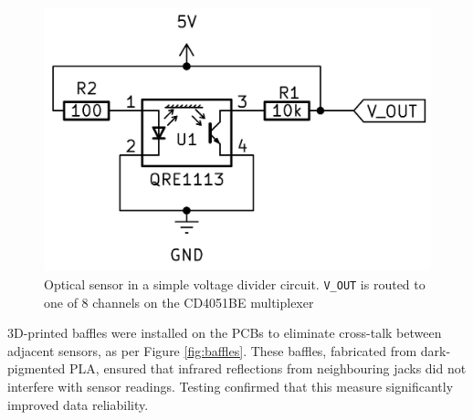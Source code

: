 \begin{figure}[b]  
  \centering
  \includegraphics[width=\linewidth]{src/images/simple-schematic-bw-.jpg} 
  \caption{Optical sensor in a simple voltage divider circuit. \texttt{V\_OUT} is routed to one of 8 channels on the CD4051BE multiplexer}
  \Description{} 
  \label{fig:simple-schematic}
\end{figure}



3D-printed baffles were installed on the PCBs to eliminate cross-talk between adjacent sensors, as per Figure \ref{fig:baffles}. These baffles, fabricated from dark-pigmented PLA, ensured that infrared reflections from neighbouring jacks did not interfere with sensor readings. Testing confirmed that this measure significantly improved data reliability.


